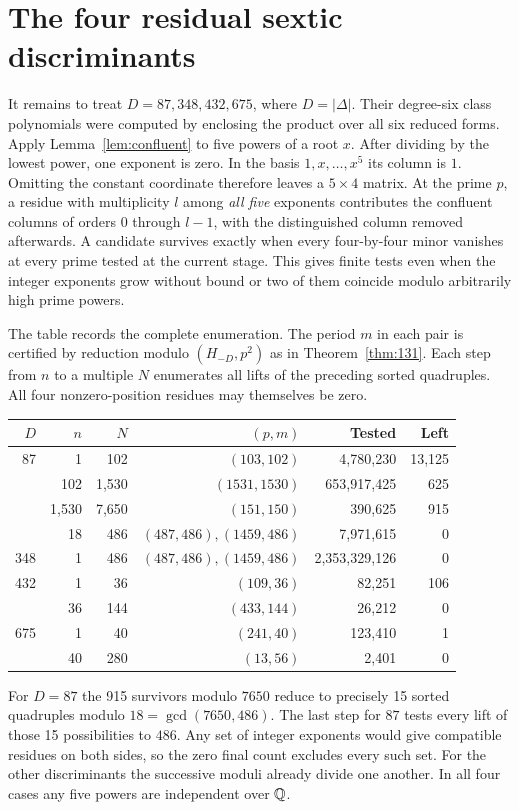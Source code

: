 \section{The four residual sextic discriminants}\label{sec:four-sieves}

It remains to treat $D=87,348,432,675$, where $D=|\Delta|$.
Their degree-six class polynomials were computed by enclosing the product
over all six reduced forms. Apply Lemma~\ref{lem:confluent} to five powers
of a root $x$. After dividing by the lowest power, one exponent is zero.
In the basis $1,x,\ldots,x^5$ its column is $1$. Omitting the constant
coordinate therefore leaves a $5\times4$ matrix. At the prime $p$, a
residue with multiplicity $l$ among \emph{all five} exponents contributes
the confluent columns of orders $0$ through $l-1$, with the distinguished
column removed afterwards. A candidate survives exactly when every
four-by-four minor vanishes at every prime tested at the current stage.
This gives finite tests even when the integer exponents grow without bound
or two of them coincide modulo arbitrarily high prime powers.

The table records the complete enumeration. The period $m$ in each
pair is certified by reduction modulo $(H_{-D},p^2)$ as in
Theorem~\ref{thm:131}. Each step from $n$ to a multiple $N$ enumerates
all lifts of the preceding sorted quadruples. All four nonzero-position
residues may themselves be zero.
\begin{center}\footnotesize
\begin{tabular}{rrrrrr}
\toprule
$D$ & $n$ & $N$ & $(p,m)$ & Tested & Left\\
\midrule
87 & 1 & 102 & $(103,102)$ &4,780,230&13,125\\
 &102 &1,530 & $(1531,1530)$ &653,917,425&625\\
 &1,530&7,650& $(151,150)$ &390,625&915\\
 &18&486& $(487,486),(1459,486)$ &7,971,615&0\\
348&1&486& $(487,486),(1459,486)$ &2,353,329,126&0\\
432&1&36& $(109,36)$ &82,251&106\\
 &36&144& $(433,144)$ &26,212&0\\
675&1&40& $(241,40)$ &123,410&1\\
 &40&280& $(13,56)$ &2,401&0\\
\bottomrule
\end{tabular}
\end{center}
For $D=87$ the 915 survivors modulo $7650$ reduce to precisely 15 sorted
quadruples modulo $18=\gcd(7650,486)$. The last step for $87$ tests every
lift of those 15 possibilities to $486$. Any set of integer exponents would
give compatible residues on both sides, so the zero final count excludes
every such set. For the other discriminants the successive moduli already
divide one another. In all four cases any five powers are independent over
$\mathbb Q$.

